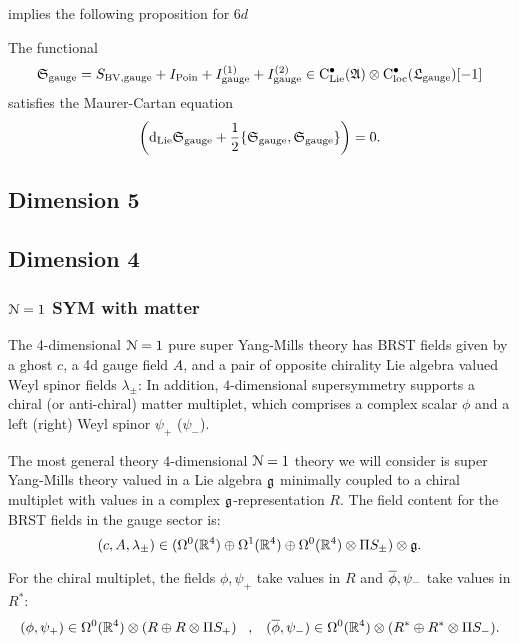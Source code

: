 \documentclass[10pt, oneside]{article}
\begin{document}
 implies the following proposition for $6d$
\begin{prop}
The functional
\[
\fS_{\rm gauge} = S_{\rm BV, gauge} + I_{\rm Poin} + I_{\rm gauge}^{(1)} + I_{\rm gauge}^{(2)} \in \clie^\bu(\mf A) \otimes \cloc^\bu(\fL_{\rm gauge}) [-1]
\]
satisfies the Maurer-Cartan equation
\[
\left(\d_{\rm Lie} \fS_{\rm gauge} + \frac{1}{2} \{\fS_{\rm gauge}, \fS_{\rm gauge}\} \right) = 0 .
\]
\end{prop}

\subsection{Dimension 5}


\subsection{Dimension 4}


\subsubsection{$\cN=1$ SYM with matter} 

The 4-dimensional $\mc N=1$ pure super Yang-Mills theory has BRST fields given by a ghost $c$, a 4d gauge field $A$, and a pair of opposite chirality Lie algebra valued Weyl spinor fields $\lambda_\pm$:
In addition, $4$-dimensional supersymmetry supports a chiral (or anti-chiral) matter multiplet, which comprises a complex scalar $\phi$ and a left (right) Weyl spinor $\psi_+$ ($\psi_-$).

The most general theory $4$-dimensional $\mc N = 1$ theory we will consider is super Yang-Mills theory valued in a Lie algebra $\fg$ minimally coupled to a chiral multiplet with values in a complex $\fg$-representation $R$. 
The field content for the BRST fields in the gauge sector is:
\[
(c, A, \lambda_\pm) \in (\Omega^0(\RR^4) \oplus \Omega^1(\RR^4) \oplus \Omega^0(\RR^4) \otimes \Pi S_\pm) \otimes \fg .
\]

For the chiral multiplet, the fields $\phi, \psi_+$ take values in $R$ and $\Bar{\phi}, \psi_-$ take values in $R^*$:
\[
(\phi, \psi_+) \in \Omega^0(\RR^4) \otimes (R \oplus R \otimes \Pi S_+) \;\;\; , \;\;\; (\Bar{\phi}, \psi_-) \in \Omega^0(\RR^4) \otimes (R^* \oplus R^* \otimes \Pi S_-) .
\]
\end{document}
